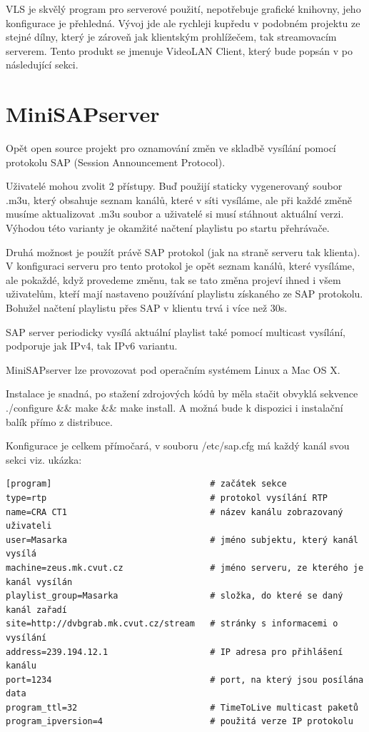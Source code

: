 VLS je skvělý program pro serverové použití, nepotřebuje grafické knihovny, jeho konfigurace je přehledná. Vývoj jde ale rychleji kupředu v podobném projektu ze stejné dílny, který je zároveň jak klientským prohlížečem, tak streamovacím serverem. Tento produkt se jmenuje VideoLAN Client, který bude popsán v po následující sekci.
\vfill
\pagebreak
\section{MiniSAPserver}

Opět open source projekt pro oznamování změn ve skladbě vysílání pomocí protokolu SAP (Session Announcement Protocol). 

Uživatelé mohou zvolit 2 přístupy. Buď použijí staticky vygenerovaný soubor .m3u, který obsahuje seznam kanálů, které v síti vysíláme, ale při každé změně musíme aktualizovat .m3u soubor a uživatelé si musí stáhnout aktuální verzi. Výhodou této varianty je okamžité načtení playlistu po startu přehrávače.

Druhá možnost je použít právě SAP protokol (jak na straně serveru tak klienta). V konfiguraci serveru pro tento protokol je opět seznam kanálů, které vysíláme, ale pokaždé, když provedeme změnu, tak se tato změna projeví ihned i všem uživatelům, kteří mají nastaveno používání playlistu získaného ze SAP protokolu. Bohužel načtení playlistu přes SAP v klientu trvá i více než 30s.

SAP server periodicky vysílá aktuální playlist také pomocí multicast vysílání, podporuje jak IPv4, tak IPv6 variantu.

MiniSAPserver lze provozovat pod operačním systémem Linux a Mac OS X. 

Instalace je snadná, po stažení zdrojových kódů by měla stačit obvyklá sekvence ./configure \&\& make \&\& make install. A možná bude k dispozici i instalační balík přímo z distribuce.

Konfigurace je celkem přímočará, v souboru /etc/sap.cfg má každý kanál svou sekci viz. ukázka: 

\begin{small}
\begin{verbatim}
[program]                               # začátek sekce
type=rtp                                # protokol vysílání RTP
name=CRA CT1                            # název kanálu zobrazovaný uživateli
user=Masarka                            # jméno subjektu, který kanál vysílá
machine=zeus.mk.cvut.cz                 # jméno serveru, ze kterého je kanál vysílán
playlist_group=Masarka                  # složka, do které se daný kanál zařadí
site=http://dvbgrab.mk.cvut.cz/stream   # stránky s informacemi o vysílání
address=239.194.12.1                    # IP adresa pro přihlášení kanálu
port=1234                               # port, na který jsou posílána data
program_ttl=32                          # TimeToLive multicast paketů
program_ipversion=4                     # použitá verze IP protokolu
\end{verbatim}
\end{small}

